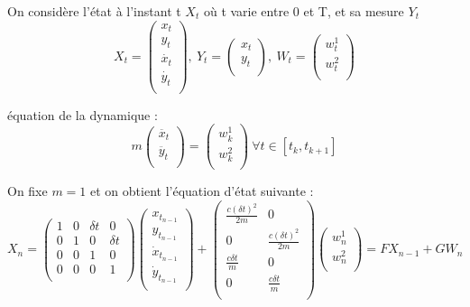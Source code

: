\documentclass{article}
\begin{document}
On considère l'état à l'instant t $X_t$ où t varie entre 0 et T, et sa mesure $Y_t$
\[ X_t = \left (
   \begin{array}{c}
      x_t \\
      y_t \\
      \Dot{x_t} \\
      \Dot{y_t} \\
   \end{array} \right )
   ,\ Y_t = \left (
   \begin{array}{c}
      x_t \\
      y_t \\
   \end{array} \right )
   ,\ W_t = \left (
   \begin{array}{c}
      w_t^1 \\
      w_t^2 \\
   \end{array} \right )
\]

équation de la dynamique : 
\[ m \left (
   \begin{array}{c}
      \ddot{x_t} \\
      \ddot{y_t} \\
   \end{array} \right )
   = \left (
   \begin{array}{c}
      w_k^1 \\
      w_k^2 \\
   \end{array} \right )\ 
   \forall t \in [t_k, t_{k+1}]
\]

On fixe $m=1$ et on obtient l'équation d'état suivante :
\[ X_n = \left ( 
   \begin{array}{cccc} %
      1 & 0 & \delta t & 0 \\
      0 & 1 & 0 & \delta t \\
      0 & 0 & 1 & 0 \\
      0 & 0 & 0 & 1 \\
   \end{array} \right )
   \left ( 
   \begin{array}{cccc} %
      x_{t_{n-1}} \\
      y_{t_{n-1}} \\
      \Dot{x}_{t_{n-1}} \\
      \Dot{y}_{t_{n-1}} \\
   \end{array} \right )
   + \left (
   \begin{array}{cc}
      \frac{c(\delta t)^2}{2m} & 0 \\
      0 & \frac{c(\delta t)^2}{2m} \\
      \frac{c\delta t}{m} & 0 \\
      0 & \frac{c\delta t}{m} \\
   \end{array} \right )
   \left (
   \begin{array}{c}
      w_n^1 \\
      w_n^2 \\
   \end{array} \right )
   = F X_{n-1} + G W_n
\]
\end{document}

